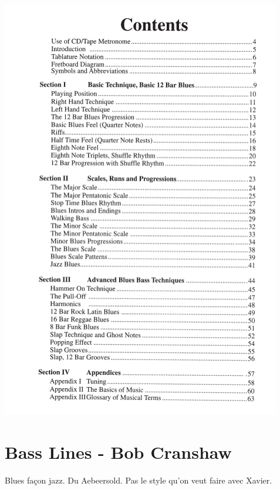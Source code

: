 \documentclass[a4paper]{book}
\begin{document}
\begin{center}
\includegraphics[width=12.196cm,height=18.44cm]{lebluessupportsmethodes-img144.png}
\end{center}
\clearpage\section{Bass Lines - Bob Cranshaw}
Blues façon jazz. Du Aebeersold. Pas le style qu'on veut faire avec Xavier.
\end{document}
